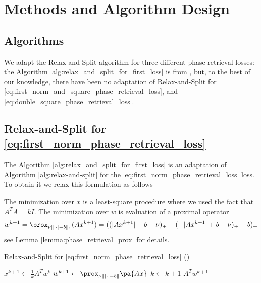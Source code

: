 \documentclass[11pt,letterpaper]{article}
\numberwithin{equation}{section} %
\numberwithin{figure}{section} %
\numberwithin{table}{section} %
\begin{document}

\section{Methods and Algorithm Design} %
\label{sec:methods}

\subsection{Algorithms} %
We adapt the Relax-and-Split algorithm for three different phase retrieval losses: the Algorithm \ref{alg:relax_and_split_for_first_loss} is from \cite{Zheng2018RelaxAndSplit}, but, to the best of our knowledge, there have been no adaptation of Relax-and-Split for \ref{eq:first_norm_and_square_phase_retrieval_loss}, and \ref{eq:double_square_phase_retrieval_loss}.

\label{sub:algorithms}
\subsection{Relax-and-Split for \ref{eq:first_norm_phase_retrieval_loss}} 
The Algorithm \ref{alg:relax_and_split_for_first_loss} is an adaptation of Algorithm \ref{alg:relax-and-split} for the \ref{eq:first_norm_phase_retrieval_loss} loss. To obtain it we relax this formulation as follows 


The minimization over $x$ is a least-square procedure
where we used the fact that $A^TA = kI$. The minimization over $w$ is evaluation of a proximal operator 
\[
    w^{k+1} = \prox_{\nu\||\cdot|-b\|_1}(Ax^{k+1}) = ((|Ax^{k+1}| - b - \nu)_+ - (-|Ax^{k+1}|+b - \nu)_+ + b)_+
\]
see Lemma \ref{lemma:phase_retrieval_prox} for details. 

\begin{algorithm}
    \caption{Relax-and-Split for \ref{eq:first_norm_phase_retrieval_loss} (\cite{Zheng2018RelaxAndSplit}) }
    \label{alg:relax_and_split_for_first_loss}
    \begin{algorithmic}[1]
            \State $x^{k+1} \gets \frac{1}{k}A^Tw^{k}$ 
            \State $w^{k+1} \gets \prox_{\nu\||\cdot| - b\|}\pa{Ax}$ 
            \State $k \gets k+1$
        \EndWhile
        \Return $A^Tw^{k+1}$
    \end{algorithmic}
\end{algorithm}
\end{document}
